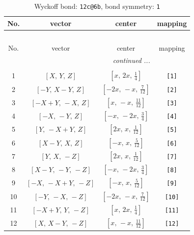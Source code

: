 \documentclass[fleqn,8pt]{jsarticle}
\begin{document}
\begin{longtable}{cccc}
\caption{Wyckoff bond: {\tt 12c@6b}, bond symmetry: {\tt 1}}
 \\
 \hline \hline
No. & vector & center & mapping \\ \hline \endfirsthead

\multicolumn{3}{l}{\tablename\ \thetable{}} \\
 \hline \hline
No. & vector & center & mapping \\ \hline \endhead

 \hline \hline
\multicolumn{3}{r}{\footnotesize\it continued ...} \\ \endfoot

 \hline \hline
\multicolumn{3}{r}{} \\ \endlastfoot

1 & $\left[ X,\, Y,\, Z \right]$ & $\left[ x,\, 2 x,\, \frac{1}{4} \right]$ & {\tt [1]} \\ \hline
2 & $\left[ - Y,\, X - Y,\, Z \right]$ & $\left[ - 2 x,\, - x,\, \frac{7}{12} \right]$ & {\tt [2]} \\ \hline
3 & $\left[ - X + Y,\, - X,\, Z \right]$ & $\left[ x,\, - x,\, \frac{11}{12} \right]$ & {\tt [3]} \\ \hline
4 & $\left[ - X,\, - Y,\, Z \right]$ & $\left[ - x,\, - 2 x,\, \frac{3}{4} \right]$ & {\tt [4]} \\ \hline
5 & $\left[ Y,\, - X + Y,\, Z \right]$ & $\left[ 2 x,\, x,\, \frac{1}{12} \right]$ & {\tt [5]} \\ \hline
6 & $\left[ X - Y,\, X,\, Z \right]$ & $\left[ - x,\, x,\, \frac{5}{12} \right]$ & {\tt [6]} \\ \hline
7 & $\left[ Y,\, X,\, - Z \right]$ & $\left[ 2 x,\, x,\, \frac{1}{12} \right]$ & {\tt [7]} \\ \hline
8 & $\left[ X - Y,\, - Y,\, - Z \right]$ & $\left[ - x,\, - 2 x,\, \frac{3}{4} \right]$ & {\tt [8]} \\ \hline
9 & $\left[ - X,\, - X + Y,\, - Z \right]$ & $\left[ - x,\, x,\, \frac{5}{12} \right]$ & {\tt [9]} \\ \hline
10 & $\left[ - Y,\, - X,\, - Z \right]$ & $\left[ - 2 x,\, - x,\, \frac{7}{12} \right]$ & {\tt [10]} \\ \hline
11 & $\left[ - X + Y,\, Y,\, - Z \right]$ & $\left[ x,\, 2 x,\, \frac{1}{4} \right]$ & {\tt [11]} \\ \hline
12 & $\left[ X,\, X - Y,\, - Z \right]$ & $\left[ x,\, - x,\, \frac{11}{12} \right]$ & {\tt [12]} \\
\end{longtable}
\end{document}
